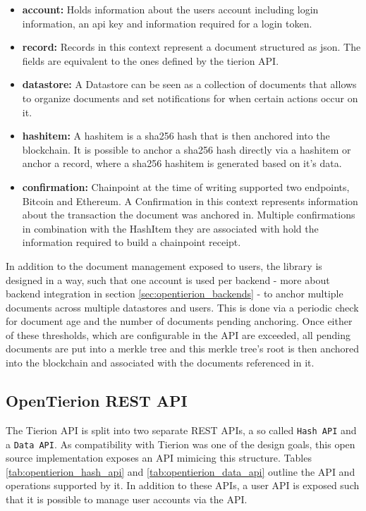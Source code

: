 \documentclass[12pt,msc,a4paper,oneside]{ucl_thesis}
\begin{document}
\begin{itemize}
    \item \textbf{account:} Holds information about the users account including login information, an api key and information required for a login token.

    \item \textbf{record:} Records in this context represent a document structured as json. The fields are equivalent to the ones defined by the tierion API.

    \item \textbf{datastore:} A Datastore can be seen as a collection of documents that allows to organize documents and set notifications for when certain actions occur on it.

    \item \textbf{hashitem:} A hashitem is a sha256 hash that is then anchored into the blockchain. It is possible to anchor a sha256 hash directly via a hashitem or anchor a record, where a sha256 hashitem is generated based on it's data.

    \item \textbf{confirmation:} Chainpoint at the time of writing supported two endpoints, Bitcoin and Ethereum. A Confirmation in this context represents information about the transaction the document was anchored in. Multiple confirmations in combination with the HashItem they are associated with hold the information required to build a chainpoint receipt.
\end{itemize}
In addition to the document management exposed to users, the library is designed in a way, such that one account is used per backend - more about backend integration in section \ref{sec:opentierion_backends} - to anchor multiple documents across multiple datastores and users. This is done via a periodic check for document age and the number of documents pending anchoring. Once either of these thresholds, which are configurable in the API are exceeded, all pending documents are put into a merkle tree and this merkle tree's root is then anchored into the blockchain and associated with the documents referenced in it.

\subsection{OpenTierion REST API} \label{sec:opentierion_rest_api}
The Tierion API is split into two separate REST APIs, a so called \texttt{Hash API} and a \texttt{Data API}. As compatibility with Tierion was one of the design goals, this open source implementation exposes an API mimicing this structure. Tables \ref{tab:opentierion_hash_api} and \ref{tab:opentierion_data_api} outline the API and operations supported by it. In addition to these APIs, a user API is exposed such that it is possible to manage user accounts via the API.
\end{document}
